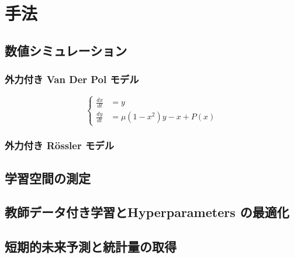 \chapter{手法}


\section{数値シミュレーション}
\subsection{外力付き Van Der Pol モデル}

\begin{comment}
    \begin{align}
    \frac{d x}{d t} &= y\\
    \frac{d y}{d t} &= \mu\left(1-x^2\right)y - x + P(x)
\end{align}

\begin{align}
    \begin{cases}
        \frac{d x}{d t} = y \\
        \frac{d y}{d t} = \mu (1 - x^2) y - x + P(x)
    \end{cases}
\end{align}
\end{comment}
    
\begin{equation}
    \left\{
    \begin{aligned}
        \frac{d x}{d t} &= y \\
        \frac{d y}{d t} &= \mu(1 - x^2)y - x + P(x)
    \end{aligned}
    \right.
\end{equation}

\subsection{外力付き Rössler モデル}

\section{学習空間の測定}
\section{教師データ付き学習とHyperparameters の最適化}
\section{短期的未来予測と統計量の取得}


\clearpage